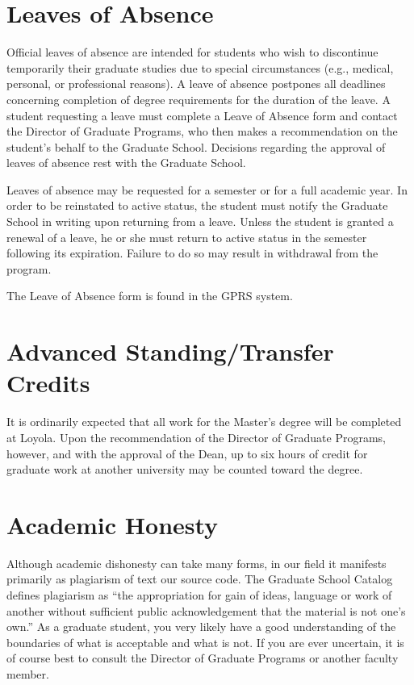\documentclass[letterpaper,10pt,english]{sphinxmanual}
\begin{document}
\section{Leaves of Absence}
\label{regulations:leaves-of-absence}
Official leaves of absence are intended for students who wish to discontinue temporarily their graduate studies due to special circumstances (e.g., medical, personal, or professional reasons). A leave of absence postpones all deadlines concerning completion of degree requirements for the duration of the leave. A student requesting a leave must complete a Leave of Absence form and contact the Director of Graduate Programs, who then makes a recommendation on the student’s behalf to the Graduate School. Decisions regarding the approval of leaves of absence rest with the Graduate School.

Leaves of absence may be requested for a semester or for a full academic year. In order to be reinstated to active status, the student must notify the Graduate School in writing upon returning from a leave. Unless the student is granted a renewal of a leave, he or she must return to active status in the semester following its expiration. Failure to do so may result in withdrawal from the program.

The Leave of Absence form is found in the GPRS system.


\section{Advanced Standing/Transfer Credits}
\label{regulations:advanced-standing-transfer-credits}
It is ordinarily expected that all work for the Master’s degree will be completed at Loyola. Upon the recommendation of the Director of Graduate Programs, however, and with the approval of the Dean, up to six hours of credit for graduate work at another university may be counted toward the degree.


\section{Academic Honesty}
\label{regulations:academic-honesty}
Although academic dishonesty can take many forms, in our field it manifests primarily as plagiarism of text our source code. The Graduate School Catalog defines plagiarism as “the appropriation for gain of ideas, language or work of another without sufficient public acknowledgement that the material is not one’s own.” As a graduate student, you very likely have a good understanding of the boundaries of what is acceptable and what is not. If you are ever uncertain, it is of course best to consult the Director of Graduate Programs or another faculty member.
\end{document}
